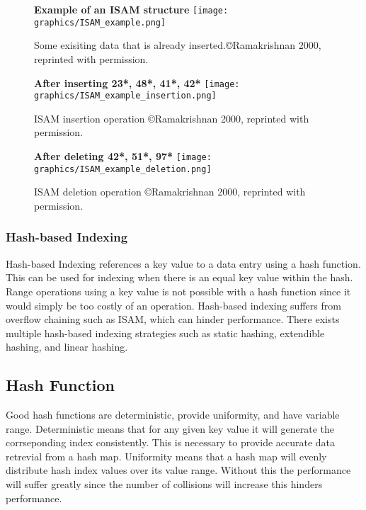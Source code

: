 \documentclass[letterpaper, 11pt]{article}
\begin{document}
\begin{figure}
  \centering
  \textbf{Example of an ISAM structure}
  \texttt{[image: graphics/ISAM\_example.png]}
  
  \caption{Some exisiting data that is already inserted.\copyright Ramakrishnan 2000, reprinted with permission.\cite{ramakrishnan2000database}}
  \label{fig:isam_example_vis}
\end{figure}

\begin{figure}
  \centering
  \textbf{After inserting 23*, 48*, 41*, 42*}
  \texttt{[image: graphics/ISAM\_example\_insertion.png]}
  \caption{ISAM insertion operation \copyright Ramakrishnan 2000, reprinted \newline with permission.\cite{ramakrishnan2000database}}
  \label{fig:isam_example_insert}
\end{figure}

\begin{figure}
  \centering
  \textbf{After deleting 42*, 51*, 97*}
  \texttt{[image: graphics/ISAM\_example\_deletion.png]}
  \caption{ISAM deletion operation \copyright Ramakrishnan 2000, reprinted \newline with permission.\cite{ramakrishnan2000database}}
  \label{fig:isam_example_delete}
\end{figure}

\subsubsection{Hash-based Indexing}
Hash-based Indexing references a key value to a data entry using a hash function. This can be
used for indexing when there is an equal key value within the hash. Range operations using
a key value is not possible with a hash function since it would simply be too costly of an
operation. Hash-based indexing suffers from overflow chaining such as ISAM, which can hinder
performance. There exists multiple hash-based indexing strategies such as static hashing, extendible hashing,
and linear hashing.
\subsection{Hash Function}
Good hash functions are deterministic, provide uniformity, and have variable range. Deterministic means
that for any given key value it will generate the corrseponding index consistently. This is
necessary to provide accurate data retrevial from a hash map. Uniformity means that a hash
map will evenly distribute hash index values over its value range. Without this the
performance will suffer greatly since the number of collisions will increase this hinders performance.
\end{document}
